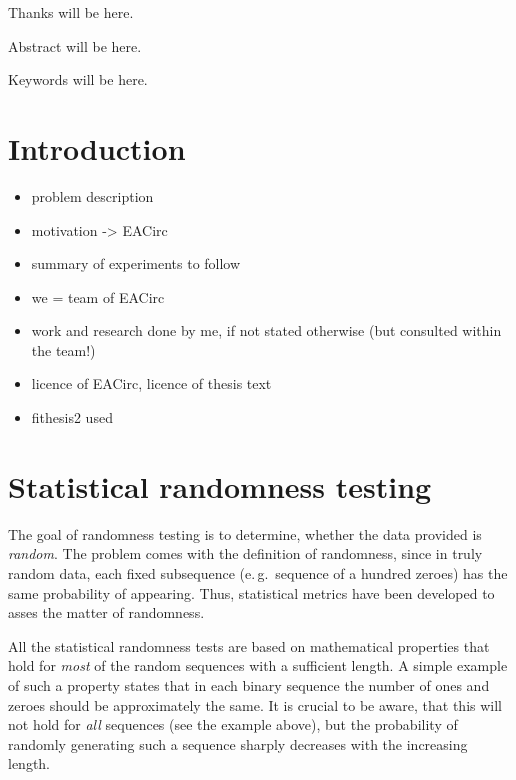 \documentclass[12pt,oneside]{fithesis2}
\begin{document}
\FrontMatter
\ThesisTitlePage

\begin{ThesisDeclaration}
\DeclarationText
\AdvisorName
\end{ThesisDeclaration}

\begin{ThesisThanks}
Thanks will be here.
\end{ThesisThanks}

\begin{ThesisAbstract}
Abstract will be here.
\end{ThesisAbstract}

\begin{ThesisKeyWords}
Keywords will be here.
\end{ThesisKeyWords}

\MainMatter
\tableofcontents
\chapter{Introduction}
\label{chap:intro}

\begin{itemize}
\item problem description
\item motivation -> EACirc
\item summary of experiments to follow
\item we = team of EACirc
\item work and research done by me, if not stated otherwise (but consulted within the team!)
\item licence of EACirc, licence of thesis text
\item fithesis2 used
\end{itemize}

\chapter{Statistical randomness testing}
\label{chap:stat-rand-testing}

The goal of randomness testing is to determine, whether the data provided is \textit{random}. 
The problem comes with the definition of randomness, since in truly random data, 
each fixed subsequence (e.\,g.\ sequence of a hundred zeroes) has the same probability of appearing.
Thus, statistical metrics have been developed to asses the matter of randomness.

All the statistical randomness tests are based on mathematical properties that hold for
\textit{most} of the random sequences with a sufficient length.
A simple example of such a property states that in each binary sequence the number of ones and zeroes should be 
approximately the same. It is crucial to be aware, that this will not hold for \textit{all} sequences (see the example above),
but the probability of randomly generating such a sequence sharply decreases with the increasing length.
\end{document}
